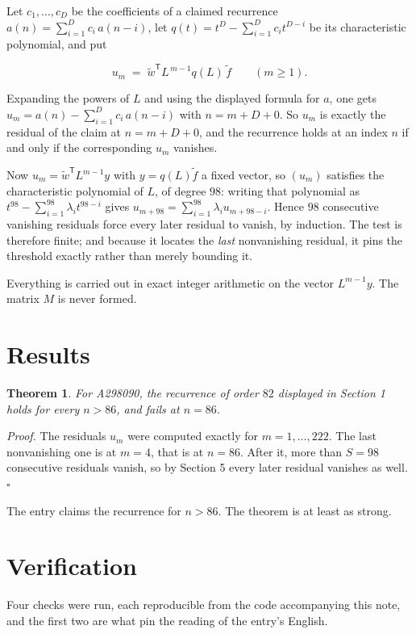 \documentclass[11pt]{article}
\newtheorem{theorem}{Theorem}
\theoremstyle{definition}
\begin{document}
Let $c_1,\dots,c_D$ be the coefficients of a claimed recurrence $a(n) = \sum_{i=1}^{D} c_i\,a(n-i)$, let $q(t) = t^{D} - \sum_{i=1}^{D} c_i t^{D-i}$ be its characteristic polynomial, and put

\[u_m \;=\; \tilde w^{\mathsf T} L^{\,m-1} q(L)\,\tilde f \qquad (m \ge 1).\]

Expanding the powers of $L$ and using the displayed formula for $a$, one gets $u_m = a(n) - \sum_{i=1}^{D} c_i\,a(n-i)$ with $n = m + D + 0$. So $u_m$ is exactly the residual of the claim at $n = m + D + 0$, and the recurrence holds at an index $n$ if and only if the corresponding $u_m$ vanishes.

Now $u_m = \tilde w^{\mathsf T} L^{m-1} y$ with $y = q(L)\tilde f$ a fixed vector, so $(u_m)$ satisfies the characteristic polynomial of $L$, of degree $98$: writing that polynomial as $t^{98} - \sum_{i=1}^{98} \lambda_i t^{98-i}$ gives $u_{m+98} = \sum_{i=1}^{98} \lambda_i u_{m+98-i}$. Hence $98$ consecutive vanishing residuals force every later residual to vanish, by induction. The test is therefore finite; and because it locates the {\itshape last} nonvanishing residual, it pins the threshold exactly rather than merely bounding it.

Everything is carried out in exact integer arithmetic on the vector $L^{m-1}y$. The matrix $M$ is never formed.

\section{Results}

\begin{theorem} For A298090, the recurrence of order $82$ displayed in Section 1 holds for every $n > 86$, and fails at $n = 86$.\end{theorem}

{\itshape Proof.} The residuals $u_m$ were computed exactly for $m = 1,\dots,222$. The last nonvanishing one is at $m = 4$, that is at $n = 86$. After it, more than $S = 98$ consecutive residuals vanish, so by Section 5 every later residual vanishes as well. $\square$

The entry claims the recurrence for $n > 86$. The theorem is at least as strong.

\section{Verification}

Four checks were run, each reproducible from the code accompanying this note, and the first two are what pin the reading of the entry's English.
\end{document}
